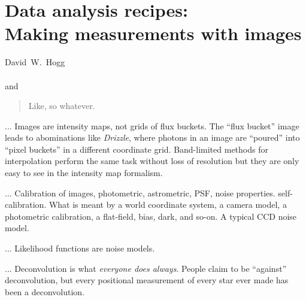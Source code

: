 \documentclass[12pt,twoside,pdftex]{article}
\begin{document}
\thispagestyle{plain}\raggedbottom
\section*{Data analysis recipes:\\
  Making measurements with images\footnotemark}


\noindent
David~W.~Hogg\\
\\
and~

\begin{abstract}
Like, so whatever.
\end{abstract}

... Images are intensity maps, not grids of flux buckets.  The ``flux
bucket'' image leads to abominations like \textsl{Drizzle}, where
photons in an image are ``poured'' into ``pixel buckets'' in a
different coordinate grid.  Band-limited methods for interpolation
perform the same task without loss of resolution but they are only
easy to see in the intensity map formalism.

... Calibration of images, photometric, astrometric, PSF, noise
properties.  self-calibration.  What is meant by a world coordinate
system, a camera model, a photometric calibration, a flat-field, bias,
dark, and so-on.  A typical CCD noise model.

... Likelihood functions are noise models.

... Deconvolution is what \emph{everyone does always}.  People claim
to be ``against'' deconvolution, but every positional measurement of
every star ever made has been a deconvolution.
\end{document}

